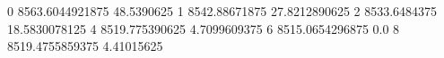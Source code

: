 0 8563.6044921875 48.5390625
1 8542.88671875 27.8212890625
2 8533.6484375 18.5830078125
4 8519.775390625 4.7099609375
6 8515.0654296875 0.0
8 8519.4755859375 4.41015625
